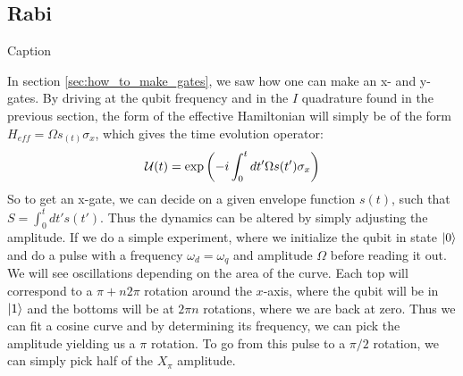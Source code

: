 \subsection{Rabi}
\begin{marginfigure}
    \centering
    \caption{Caption}
    \label{fig:enter-label}
\end{marginfigure}
In section \ref{sec:how_to_make_gates}, we saw how one can make an x- and y-gates. By driving at the qubit frequency and in the $I$ quadrature found in the previous section, the form of the effective Hamiltonian will simply be of the form $H_{eff} = \Omega s_(t) \sigma_x$, which gives the time evolution operator:
\begin{equation}
    \mathcal{U}(t) = \exp\left(-i\int_0^t dt' \Omega s(t') \sigma_x \right)
\end{equation}
So to get an x-gate, we can decide on a given envelope function $s(t)$, such that $S = \int_0^t  dt' s(t')$. Thus the dynamics can be altered by simply adjusting the amplitude. If we do a simple experiment, where we initialize the qubit in state $\ket{0}$ and do a pulse with a frequency $\omega_d = \omega_q$ and amplitude $\Omega$ before reading it out. We will see oscillations depending on the area of the curve. Each top will correspond to a $\pi +n2\pi$ rotation around the $x$-axis, where the qubit will be in $\ket{1}$ and the bottoms will be at $2\pi n$ rotations, where we are back at zero. Thus we can fit a cosine curve and by determining its frequency, we can pick the amplitude yielding us a $\pi$ rotation. To go from this pulse to a $\pi/2$ rotation, we can simply pick half of the $X_{\pi}$ amplitude.

